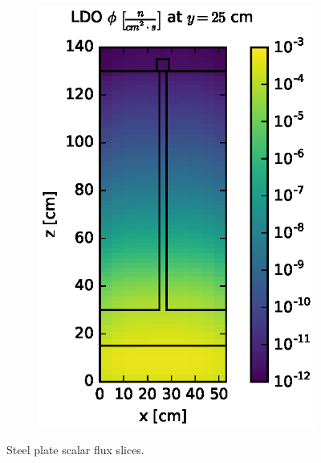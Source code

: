 \documentclass{article} %
\begin{document}
\begin{figure}[!htb]
\begin{subfigure}{0.4\textwidth}
\includegraphics[max height=0.445\textheight]
{img/steel-fwd-flux-ldo11.eps}
\end{subfigure}
\caption{Steel plate scalar flux slices.}
\label{steel-fwd-slices}
\end{figure}
\end{document}
